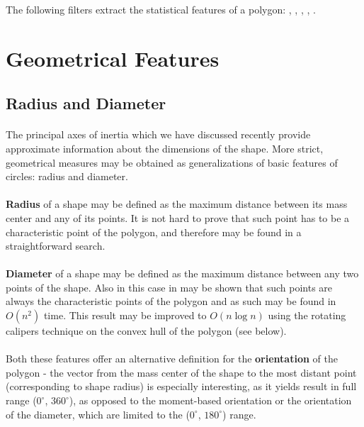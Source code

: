 \begin{refImpl}
The following \studio filters extract the statistical features of a polygon: 
, 
, 
, 
,
. 
\end{refImpl}

\section{Geometrical Features}

\subsection{Radius and Diameter}

\paragraph*{}
The principal axes of inertia which we have discussed recently provide approximate information about the dimensions of the shape. More strict, geometrical measures may be obtained as generalizations of basic features of circles: radius and diameter.

\paragraph*{}
\textbf{Radius} of a shape may be defined as the maximum distance between its mass center and any of its points. It is not hard to prove that such point has to be a characteristic point of the polygon, and therefore may be found in a straightforward search.

\paragraph*{}
\textbf{Diameter} of a shape may be defined as the maximum distance between any two points of the shape. Also in this case in may be shown that such points are always the characteristic points of the polygon and as such may be found in $O(n^2)$ time. This result may be improved to $O(n\log n)$ using the rotating calipers technique\cite{Toussaint83} on the convex hull of the polygon (see below).

\paragraph*{}
Both these features offer an alternative definition for the \textbf{orientation} of the polygon - the vector from the mass center of the shape to the most distant point (corresponding to shape radius) is especially interesting, as it yields result in full range ($0^{\circ}$, $360^{\circ}$), as opposed to the moment-based orientation or the orientation of the diameter, which are limited to the ($0^{\circ}$, $180^{\circ}$) range.

